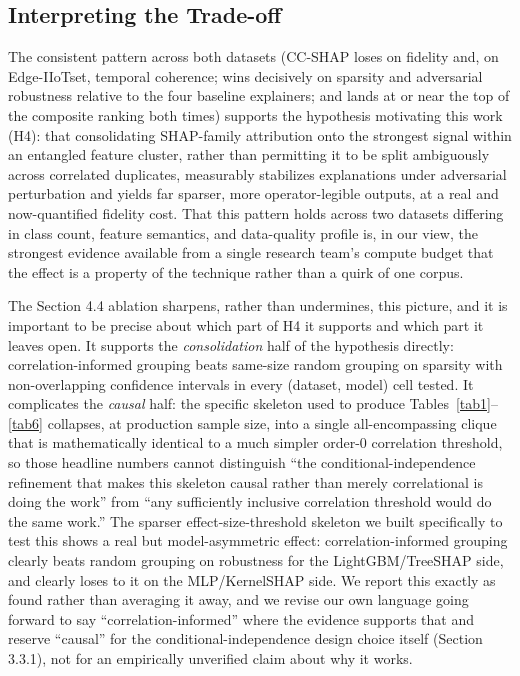 \subsection{Interpreting the Trade-off}\label{interpreting-the-trade-off}

The consistent pattern across both datasets (CC-SHAP loses on fidelity and, on Edge-IIoTset, temporal coherence; wins decisively on sparsity and adversarial robustness relative to the four baseline explainers; and lands at or near the top of the composite ranking both times) supports the hypothesis motivating this work (H4): that consolidating SHAP-family attribution onto the strongest signal within an entangled feature cluster, rather than permitting it to be split ambiguously across correlated duplicates, measurably stabilizes explanations under adversarial perturbation and yields far sparser, more operator-legible outputs, at a real and now-quantified fidelity cost. That this pattern holds across two datasets differing in class count, feature semantics, and data-quality profile is, in our view, the strongest evidence available from a single research team's compute budget that the effect is a property of the technique rather than a quirk of one corpus.

The Section 4.4 ablation sharpens, rather than undermines, this picture, and it is important to be precise about which part of H4 it supports and which part it leaves open. It supports the \emph{consolidation} half of the hypothesis directly: correlation-informed grouping beats same-size random grouping on sparsity with non-overlapping confidence intervals in every (dataset, model) cell tested. It complicates the \emph{causal} half: the specific skeleton used to produce Tables~\ref{tab1}--\ref{tab6} collapses, at production sample size, into a single all-encompassing clique that is mathematically identical to a much simpler order-0 correlation threshold, so those headline numbers cannot distinguish ``the conditional-independence refinement that makes this skeleton causal rather than merely correlational is doing the work'' from ``any sufficiently inclusive correlation threshold would do the same work.'' The sparser effect-size-threshold skeleton we built specifically to test this shows a real but model-asymmetric effect: correlation-informed grouping clearly beats random grouping on robustness for the LightGBM/TreeSHAP side, and clearly loses to it on the MLP/KernelSHAP side. We report this exactly as found rather than averaging it away, and we revise our own language going forward to say ``correlation-informed'' where the evidence supports that and reserve ``causal'' for the conditional-independence design choice itself (Section 3.3.1), not for an empirically unverified claim about why it works.

